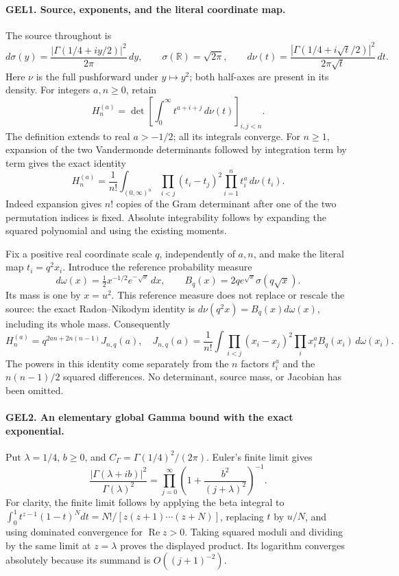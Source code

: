 \paragraph{GEL1. Source, exponents, and the literal coordinate map.}
The source throughout is
\[
 d\sigma(y)=\frac{|\Gamma(1/4+iy/2)|^2}{2\pi}\,dy,
 \qquad \sigma(\mathbb R)=\sqrt{2\pi},\qquad
 d\nu(t)=\frac{|\Gamma(1/4+i\sqrt t/2)|^2}{2\pi\sqrt t}\,dt.
 \tag{GEL1}
\]
Here \(\nu\) is the full pushforward under \(y\mapsto y^2\); both
half-axes are present in its density. For integers \(a,n\geq0\), retain
\[
 H_n^{(a)}=\det\left[\int_0^\infty t^{a+i+j}\,d\nu(t)\right]_{i,j<n}.
\]
The definition extends to real \(a>-1/2\); all its integrals converge.
For \(n\geq1\), expansion of the two Vandermonde determinants followed
by integration term by term gives the exact identity
\[
 H_n^{(a)}=\frac1{n!}\int_{(0,\infty)^n}
       \prod_{i<j}(t_i-t_j)^2\prod_{i=1}^n t_i^a\,d\nu(t_i).
 \tag{GEL2}
\]
Indeed expansion gives \(n!\) copies of the Gram determinant after one
of the two permutation indices is fixed. Absolute integrability follows
by expanding the squared polynomial and using the existing moments.

Fix a positive real coordinate scale \(q\), independently of \(a,n\),
and make the literal map \(t_i=q^2x_i\). Introduce the reference
probability measure
\[
 d\omega(x)=\tfrac12x^{-1/2}e^{-\sqrt x}\,dx,
 \qquad B_q(x)=2q e^{\sqrt x}\sigma(q\sqrt x).
\]
Its mass is one by \(x=u^2\). This reference measure does not replace
or rescale the source: the exact Radon--Nikodym identity is
\(d\nu(q^2x)=B_q(x)d\omega(x)\), including its whole mass. Consequently
\[
 \boxed{H_n^{(a)}=q^{2an+2n(n-1)}J_{n,q}(a),\quad
 J_{n,q}(a)=\frac1{n!}\int\prod_{i<j}(x_i-x_j)^2
                         \prod_i x_i^aB_q(x_i)\,d\omega(x_i).}
 \tag{GEL3}
\]
The powers in this identity come separately from the \(n\) factors
\(t_i^a\) and the \(n(n-1)/2\) squared differences. No determinant,
source mass, or Jacobian has been omitted.

\paragraph{GEL2. An elementary global Gamma bound with the exact exponential.}
Put \(\lambda=1/4\), \(b\geq0\), and
\(C_\Gamma=\Gamma(1/4)^2/(2\pi)\). Euler's finite limit gives
\[
 \frac{|\Gamma(\lambda+ib)|^2}{\Gamma(\lambda)^2}
 =\prod_{j=0}^\infty\left(1+\frac{b^2}{(j+\lambda)^2}\right)^{-1}.
\]
For clarity, the finite limit follows by applying the beta integral to
\(\int_0^1t^{z-1}(1-t)^Ndt=N!/[z(z+1)\cdots(z+N)]\), replacing
\(t\) by \(u/N\), and using dominated convergence for
\(\operatorname{Re}z>0\). Taking squared moduli and dividing by the
same limit at \(z=\lambda\) proves the displayed product. Its logarithm
converges absolutely because its summand is \(O((j+1)^{-2})\).

